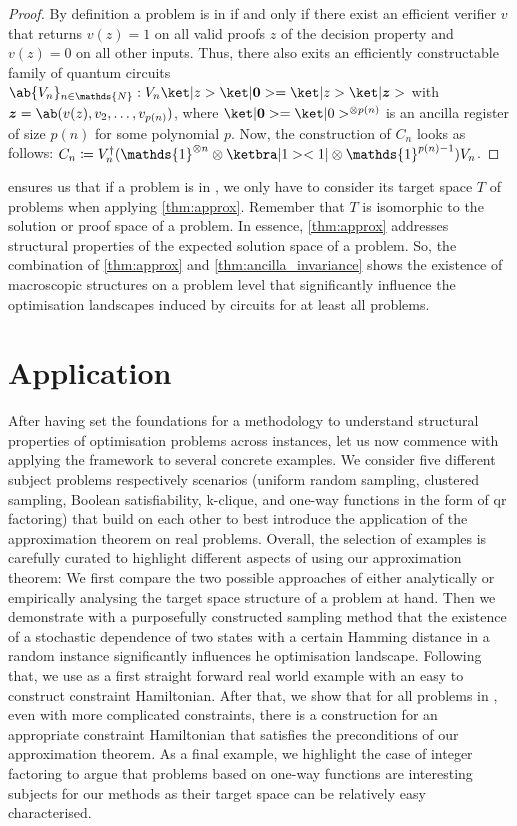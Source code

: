 \begin{proof}
    By definition a problem is in \NP if and only if there exist an efficient verifier $v$ that returns $v(z) = 1$ on all valid proofs $z$ of the decision property and $v(z) = 0$ on all other inputs. Thus, there also exits an efficiently constructable family of quantum circuits $\ab\{V_n\}_{n \in \mathds{N}} : V_n \ket|z>\ket|\bm{0}> = \ket|z>\ket|\bm{z}>$ with $\bm{z} = \ab(v(z), v_2, \dots, v_{p(n)})$, where $\ket|\bm{0}> = \ket|0>^{\otimes p(n)}$ is an ancilla register of size $p(n)$ for some polynomial $p$. Now, the construction of $C_n$ looks as follows: $C_n \coloneqq V_n^\dagger (\mathds{1}^{\otimes n} \otimes \ketbra|1><1| \otimes \mathds{1}^{p(n) - 1}) V_n$.
\end{proof}

\begin{remark}
     ensures us that if a problem is in \NP, we only have to consider its target space $T$ of problems when applying \cref{thm:approx}. Remember that $T$ is isomorphic to the solution or proof space of a problem. In essence, \cref{thm:approx} addresses structural properties of the expected solution space of a problem. So, the combination of \cref{thm:approx} and \cref{thm:ancilla_invariance} shows the existence of macroscopic structures on a problem level that significantly influence the optimisation landscapes induced by \QAOA circuits for at least all \NP problems. 
\end{remark}

\section{Application}
\label{sec:application}
After having set the foundations for a methodology to understand
structural properties of optimisation problems across instances, let us now
commence with applying the framework to several concrete examples. We consider five different subject problems respectively scenarios (uniform random sampling, clustered 
sampling,  Boolean satisfiability, k-clique, and one-way functions in the form of qr factoring) that build on each other to best introduce the application of the \QAOA approximation theorem on real problems. Overall, the selection of examples is carefully curated to highlight different aspects of using our approximation theorem: We first compare the two possible approaches of either analytically or empirically analysing the target space structure of a problem at hand. Then we demonstrate with a purposefully constructed sampling method that the existence of a stochastic dependence of two states with a certain Hamming distance in a random instance significantly influences he optimisation landscape. Following that, we use \SAT as a first straight forward real world example with an easy to construct constraint Hamiltonian. After that, we show that for all problems in \NP, even with more complicated constraints, there is a construction for an appropriate constraint Hamiltonian that satisfies the preconditions of our approximation theorem. As a final example, we highlight the case of integer factoring to argue that problems based on
one-way functions are interesting subjects for our methods as their target space can be relatively easy characterised.

